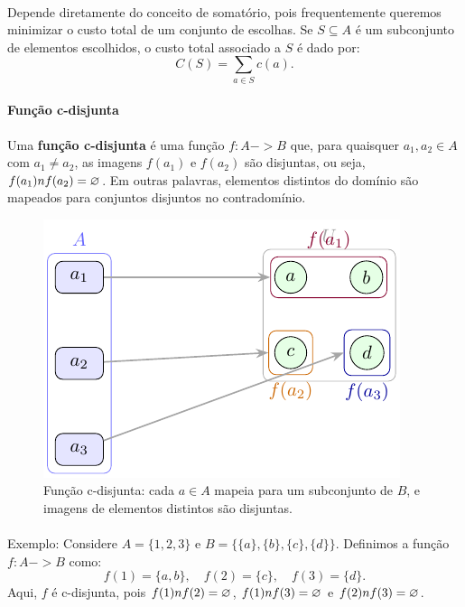 \documentclass[12pt,a4paper]{article}
\def\emph#1{#1}%
\def\cap{\string n}%
\def\to{->}%
\begin{document}
\paragraph{}
Depende diretamente do conceito de somatório, pois frequentemente queremos minimizar o custo total de um conjunto de escolhas. Se \(S \subseteq A\) é um subconjunto de elementos escolhidos, o custo total associado a \(S\) é dado por:
\[C(S) = \sum_{a \in S} c(a).\] 

\paragraph{Função c-disjunta}
Uma \textbf{função c-disjunta} é uma função \(f: A \to B\) que, para quaisquer \(a_1, a_2 \in A\) com \(a_1 \neq a_2\), as imagens \(f(a_1)\) e \(f(a_2)\) são disjuntas, ou seja, \(f(a_1) \cap f(a_2) = \varnothing\). Em outras palavras, elementos distintos do domínio são mapeados para conjuntos disjuntos no contradomínio.


\begin{figure}[H]
    \centering
    \includegraphics[width=0.9\linewidth]{figures/fig_c_disjunta.pdf}

    \caption{Função c-disjunta: cada \(a\in A\) mapeia para um \emph{subconjunto} de $B$, e imagens de elementos distintos são disjuntas.}
    \label{fig:c-disjunta}
    \end{figure}


\paragraph{}
Exemplo: Considere \(A = \{1, 2, 3\}\) e \(B = \{\{a\}, \{b\}, \{c\}, \{d\}\}\). Definimos a função \(f: A \to B\) como:
\[f(1) = \{a, b\}, \quad f(2) = \{c\}, \quad f(3) = \{d\}.\]
Aqui, \(f\) é c-disjunta, pois \(f(1) \cap f(2) = \varnothing\), \(f(1) \cap f(3) = \varnothing\) e \(f(2) \cap f(3) = \varnothing\).
\end{document}
